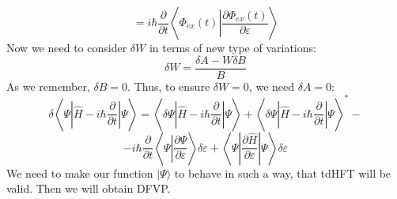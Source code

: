 $$=i\hbar\frac{\partial}{\partial t}\left\langle\Phi_{ex}(t)\left|\frac{\partial\Phi_{ex}(t)}{\partial\varepsilon}\right.\right\rangle$$
Now we need to consider $\delta W$ in terms of new type of variations:
$$\delta W = \frac{\delta A - W\delta B}{B}$$
As we remember, $\delta B = 0$. Thus, to ensure $\delta W = 0$, we need $\delta A = 0$:
$$\delta\left\langle\Psi\left|\hat{H}-i\hbar\frac{\partial}{\partial t}\right|\Psi\right\rangle=%
	\left\langle\delta\Psi\left|\hat{H}-i\hbar\frac{\partial}{\partial t}\right|\Psi\right\rangle + %
	\left\langle\delta\Psi\left|\hat{H}-i\hbar\frac{\partial}{\partial t}\right|\Psi\right\rangle^*-$$
$$      -i\hbar\frac{\partial}{\partial t}\left\langle\Psi\left|\frac{\partial\Psi}{\partial\varepsilon}\right.\right\rangle\delta\varepsilon+%
	\left\langle\Psi\left|\frac{\partial\hat{H}}{\partial\varepsilon}\right|\Psi\right\rangle\delta\varepsilon
	$$
We need to make our function $|\Psi\rangle$ to behave in such a way, 
that tdHFT will be valid. 
Then we will obtain DFVP.
